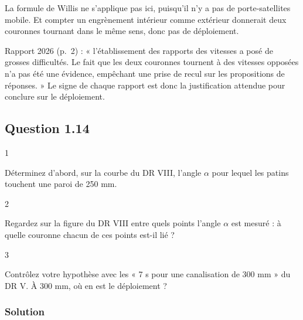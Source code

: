 \documentclass[11pt,a4paper]{article}
\begin{document}
\begin{piege}

La formule de Willis ne s'applique pas ici, puisqu'il n'y a pas de porte-satellites mobile. Et compter un engrènement intérieur comme extérieur donnerait deux couronnes tournant dans le même sens, donc pas de déploiement.

\end{piege}

\begin{jury}

Rapport 2026 (p.~2) : « l'établissement des rapports des vitesses a posé de grosses difficultés. Le fait que les deux couronnes tournent à des vitesses opposées n'a pas été une évidence, empêchant une prise de recul sur les propositions de réponses. » Le signe de chaque rapport est donc la justification attendue pour conclure sur le déploiement.

\end{jury}

\hypertarget{question-1.14}{%
\subsection{Question 1.14}\label{question-1.14}}

\begin{indication}{1}

Déterminez d'abord, sur la courbe du DR VIII, l'angle \(\alpha\) pour lequel les patins touchent une paroi de 250 mm.

\end{indication}

\begin{indication}{2}

Regardez sur la figure du DR VIII entre quels points l'angle \(\alpha\) est mesuré : à quelle couronne chacun de ces points est-il lié ?

\end{indication}

\begin{indication}{3}

Contrôlez votre hypothèse avec les « 7 s pour une canalisation de 300 mm » du DR V. À 300 mm, où en est le déploiement ?

\end{indication}

\hypertarget{solution-13}{%
\subsubsection{Solution}\label{solution-13}}
\end{document}
